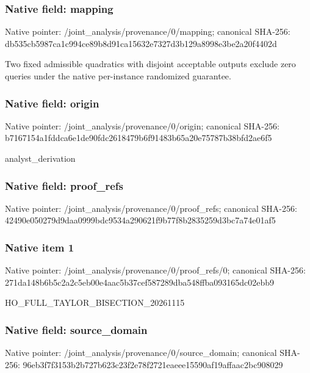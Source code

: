 \documentclass[10pt,a4paper]{article}
\begin{document}
\subsubsection{Native field: mapping}
Native pointer: /joint\_\allowbreak{}analysis/provenance/0/mapping; canonical SHA-256: db535cb5987ca1c994ce89b8d91ca15632e7327d3b129a8998e3be2a20f4402d

\begingroup\raggedright\sloppy Two fixed admissible quadratics with disjoint acceptable outputs exclude zero queries under the native per-instance randomized guarantee.\par\endgroup

\subsubsection{Native field: origin}
Native pointer: /joint\_\allowbreak{}analysis/provenance/0/origin; canonical SHA-256: b7167154a1fddca6e1de90fdc2618479b6f91483b65a20e75787b38bfd2ae6f5

\begingroup\raggedright\sloppy analyst\_\allowbreak{}derivation\par\endgroup

\subsubsection{Native field: proof\_\allowbreak{}refs}
Native pointer: /joint\_\allowbreak{}analysis/provenance/0/proof\_\allowbreak{}refs; canonical SHA-256: 42490e050279d9daa0999bdc9534a290621f9b77f8b2835259d3bc7a74e01af5

\subsubsection{Native item 1}
Native pointer: /joint\_\allowbreak{}analysis/provenance/0/proof\_\allowbreak{}refs/0; canonical SHA-256: 271da148b6b5c2a2c5eb00e4aac5b37cef587289dba548ffba093165dc02ebb9

\begingroup\raggedright\sloppy HO\_\allowbreak{}FULL\_\allowbreak{}TAYLOR\_\allowbreak{}BISECTION\_\allowbreak{}20261115\par\endgroup

\subsubsection{Native field: source\_\allowbreak{}domain}
Native pointer: /joint\_\allowbreak{}analysis/provenance/0/source\_\allowbreak{}domain; canonical SHA-256: 96eb3f7f3153b2b727b623c23f2e78f2721eaeee15590af19affaac2bc908029
\end{document}
